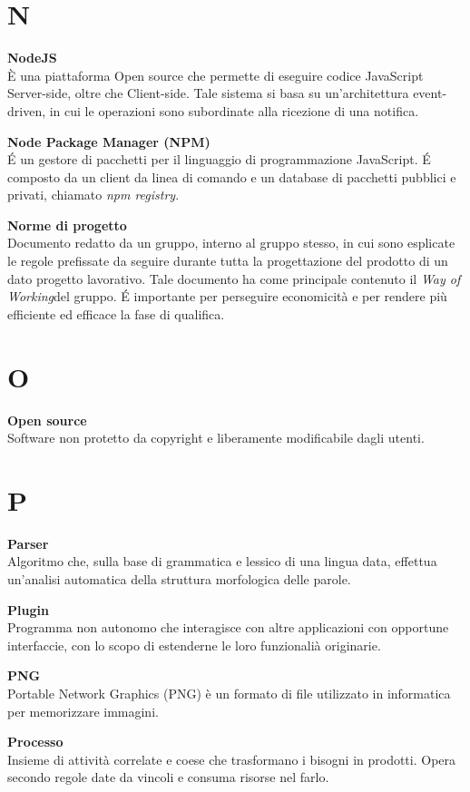 \documentclass[a4paper, oneside, openany, dvipsnames, table, 12pt]{article}
\begin{document}
\newpage
\section{N}
\textbf{NodeJS}\\	
\`E una piattaforma Open source che permette di eseguire codice JavaScript Server-side, oltre che Client-side. Tale sistema si basa su un'architettura event-driven, in cui le operazioni sono subordinate alla ricezione di una notifica.

\textbf{Node Package Manager (NPM)} \\
\'E un gestore di pacchetti per il linguaggio di programmazione JavaScript.
\'E composto da un client da linea di comando e un database di pacchetti pubblici e privati, chiamato \textit{npm registry}. 

\textbf{Norme di progetto} \\
Documento redatto da un gruppo, interno al gruppo stesso, in cui sono esplicate le regole prefissate da seguire durante tutta la progettazione del prodotto di un dato progetto lavorativo. Tale documento ha come principale contenuto il \textit{Way of Working}\glo del gruppo. \'E importante per perseguire economicità e per rendere più efficiente ed efficace la fase di qualifica.

\newpage
\section{O}
\label{par:opens}
\textbf{Open source} \\
Software non protetto da copyright e liberamente modificabile dagli utenti.

\newpage
\section{P}
\textbf{Parser} \\
Algoritmo che, sulla base di grammatica e lessico di una lingua data, effettua un’analisi automatica della struttura morfologica delle parole.

\textbf{Plugin} \\
Programma non autonomo che interagisce con altre applicazioni con opportune interfaccie, con lo scopo di estenderne le loro funzionalià originarie.

\textbf{PNG} \\
Portable Network Graphics (PNG) è un formato di file utilizzato in informatica per memorizzare immagini.

\textbf{Processo} \\
Insieme di attività correlate e coese che trasformano i bisogni in prodotti. Opera secondo regole date da vincoli e consuma risorse nel farlo.
\end{document}
